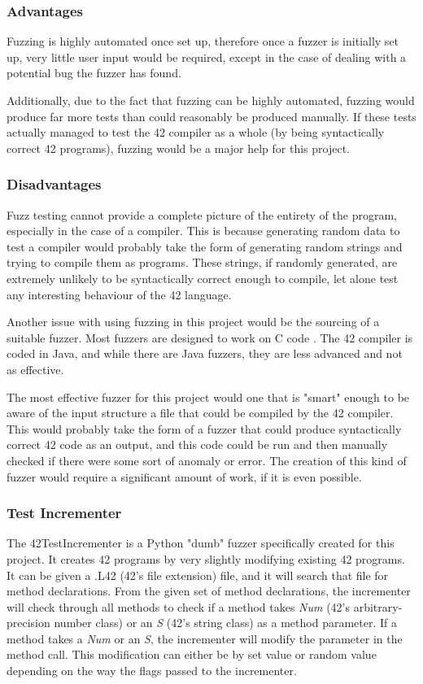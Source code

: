\subsubsection{Advantages}

Fuzzing is highly automated once set up, therefore once a fuzzer is initially set up, very little user input would be required, except in the case of dealing with a potential bug the fuzzer has found.

Additionally, due to the fact that fuzzing can be highly automated, fuzzing would produce far more tests than could reasonably be produced manually. If these tests actually managed to test the 42 compiler as a whole (by being syntactically correct 42 programs), fuzzing would be a major help for this project.

\subsubsection{Disadvantages}

Fuzz testing cannot provide a complete picture of the entirety of the program, especially in the case of a compiler. This is because generating random data to test a compiler would probably take the form of generating random strings and trying to compile them as programs. These strings, if randomly generated, are extremely unlikely to be syntactically correct enough to compile, let alone test any interesting behaviour of the 42 language.

Another issue with using fuzzing in this project would be the sourcing of a suitable fuzzer. Most fuzzers are designed to work on C code \cite{afl}. The 42 compiler is coded in Java, and while there are Java fuzzers, they are less advanced and not as effective.

The most effective fuzzer for this project would one that is "smart" enough to be aware of the input structure a file that could be compiled by the 42 compiler. This would probably take the form of a fuzzer that could produce syntactically correct 42 code as an output, and this code could be run and then manually checked if there were some sort of anomaly or error. The creation of this kind of fuzzer would require a significant amount of work, if it is even possible.

\subsubsection{Test Incrementer \label{incrementerSec}}
The 42TestIncrementer \cite{incrementer} is a Python "dumb" fuzzer specifically created for this project. It creates 42 programs by very slightly modifying existing 42 programs. It can be given a .L42 (42's file extension) file, and it will search that file for method declarations. From the given set of method declarations, the incrementer will check through all methods to check if a method takes \textit{Num} (42's arbitrary-precision number class) or an \textit{S} (42's string class) as a method parameter. If a method takes a \textit{Num} or an \textit{S}, the incrementer will modify the parameter in the method call. This modification can either be by set value or random value depending on the way the flags passed to the incrementer.

